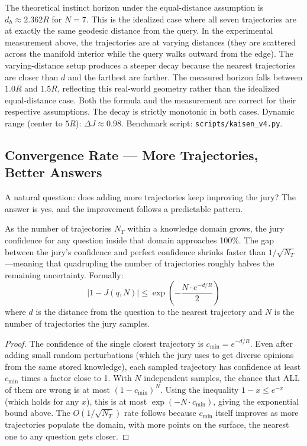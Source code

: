\documentclass[11pt]{article}
\begin{document}
The theoretical instinct horizon under the equal-distance assumption is $d_h \approx 2.362R$ for $N=7$. This is the idealized case where all seven trajectories are at exactly the same geodesic distance from the query. In the experimental measurement above, the trajectories are at varying distances (they are scattered across the manifold interior while the query walks outward from the edge). The varying-distance setup produces a steeper decay because the nearest trajectories are closer than $d$ and the farthest are farther. The measured horizon falls between $1.0R$ and $1.5R$, reflecting this real-world geometry rather than the idealized equal-distance case. Both the formula and the measurement are correct for their respective assumptions. The decay is strictly monotonic in both cases. Dynamic range (center to $5R$): $\Delta J \approx 0.98$. Benchmark script: \verb|scripts/kaisen_v4.py|.

\subsection{Convergence Rate --- More Trajectories, Better Answers}

A natural question: does adding more trajectories keep improving the jury?
The answer is yes, and the improvement follows a predictable pattern.

\begin{theorem}\label{thm:convergence}
As the number of trajectories $N_T$ within a knowledge domain grows, the jury
confidence for any question inside that domain approaches 100\%. The gap
between the jury's confidence and perfect confidence shrinks faster than
$1/\sqrt{N_T}$---meaning that quadrupling the number of trajectories roughly
halves the remaining uncertainty. Formally:
\begin{equation}
|1 - J(q, N)| \le \exp\left(-\frac{N \cdot e^{-d/R}}{2}\right)
\end{equation}
where $d$ is the distance from the question to the nearest trajectory and $N$
is the number of trajectories the jury samples.
\end{theorem}
\begin{proof}
The confidence of the single closest trajectory is $c_{\min} = e^{-d/R}$.
Even after adding small random perturbations (which the jury uses to get
diverse opinions from the same stored knowledge), each sampled trajectory
has confidence at least $c_{\min}$ times a factor close to 1. With $N$
independent samples, the chance that ALL of them are wrong is at most
$(1 - c_{\min})^N$. Using the inequality $1 - x \le e^{-x}$ (which holds
for any $x$), this is at most $\exp(-N \cdot c_{\min})$, giving the
exponential bound above. The $O(1/\sqrt{N_T})$ rate follows because
$c_{\min}$ itself improves as more trajectories populate the domain, with
more points on the surface, the nearest one to any question gets closer.
\end{proof}
\end{document}
